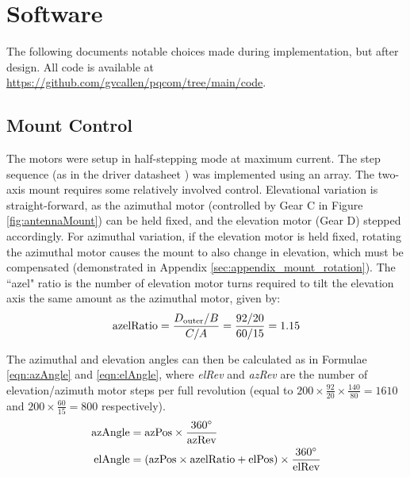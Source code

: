 \section{Software}
The following documents notable choices made during implementation, but after design. All code is available at \url{https://github.com/gvcallen/pqcom/tree/main/code}.

\subsection{Mount Control}
The motors were setup in half-stepping mode at maximum current. The step sequence (as in the driver datasheet \cite{datasheet-L6219}) was implemented using an array. The two-axis mount requires some relatively involved control. Elevational variation is straight-forward, as the azimuthal motor (controlled by Gear C in Figure \ref{fig:antennaMount}) can be held fixed, and the elevation motor (Gear D) stepped accordingly. For azimuthal variation, if the elevation motor is held fixed, rotating the azimuthal motor causes the mount to also change in elevation, which must be compensated (demonstrated in Appendix \ref{sec:appendix_mount_rotation}). The ``azel" ratio is the number of elevation motor turns required to tilt the elevation axis the same amount as the azimuthal motor, given by:
\newpage
\begin{equation}\label{eqn:azelRatio}
\textnormal{azelRatio} = \frac{D_{\textnormal{outer}} / B}{C / A} = \frac{92 / 20}{60 / 15} = 1.15
\end{equation}

\noindent The azimuthal and elevation angles can then be calculated as in Formulae \ref{eqn:azAngle} and \ref{eqn:elAngle}, where \textit{elRev} and \textit{azRev} are the number of elevation/azimuth motor steps per full revolution (equal to $200 \times \frac{92}{20} \times \frac{140}{80} = 1610$ and $200 \times \frac{60}{15} = 800$ respectively).
\begin{align}
    \textnormal{azAngle} &= \textnormal{azPos} \times \frac{360 ^{\circ}}{\textnormal{azRev}} \label{eqn:azAngle} \\
    \textnormal{elAngle} &= (\textnormal{azPos} \times \textnormal{azelRatio} + \textnormal{elPos}) \times \frac{360 ^{\circ}}{\textnormal{elRev}} \label{eqn:elAngle}
\end{align}

